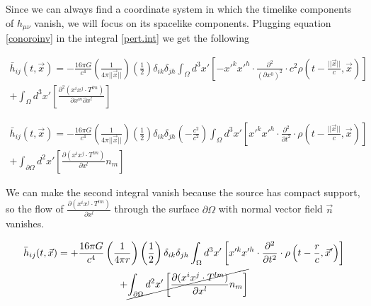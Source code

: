 Since we can always find a coordinate system in which the timelike components of $h_{\mu\nu}$ vanish, we will focus on its spacelike components. Plugging equation \ref{conoroinv} in the integral \ref{pert.int} we get the following


\begin{equation}
\begin{gathered}
\bar{h}_{ij}(t, \vec{x}) = -\frac{16\pi G}{c^4} \left(\frac{1}{4\pi||\vec{x}||}\right) \left(\frac{1}{2} \right) \delta_{ik} \delta_{jh} \int_{\Omega} d^3x' \left[ -x'^k x'^h \cdot \frac{\partial^2}{(\partial {x^0})^2} \cdot c^2  \rho\left(t-\frac{||\vec{x}||}{c}, \vec{x}\right)\right] \\ 
+ \int_{\Omega} d^3x' \left[\frac{\partial^2(x^i x^j \cdot T^{lm})}{\partial x^m \partial x^l} \right]
\end{gathered} 
\end{equation}

\begin{equation}
\begin{gathered}
\bar{h}_{ij}(t, \vec{x}) = -\frac{16\pi G}{c^4} \left(\frac{1}{4\pi||\vec{x}||}\right) \left(\frac{1}{2} \right) \delta_{ik} \delta_{jh} \left(-\frac{c^2}{c^2}\right) \int_{\Omega} d^3x' \left[ x'^k x'^h \cdot \frac{\partial^2}{\partial t^2} \cdot  \rho\left(t-\frac{||\vec{x}||}{c}, \vec{x}\right) \right] \\+  \int_{\partial\Omega} d^2x' \left[ \frac{\partial(x^i x^j \cdot T^{lm})}{\partial x^l} n_m \right] 
\end{gathered}
\end{equation}


We can make the second integral vanish because the source has compact support, so the flow of $\frac{\partial(x^i x^j \cdot T^{lm})}{\partial x^l}$ through the surface $\partial \Omega$ with normal vector field $\vec{n}$ vanishes.

\begin{equation}
\begin{gathered}
\bar{h}_{ij}(t, \vec{x}) = +\frac{16\pi G}{c^4} \left(\frac{1}{4\pi r}\right) \left(\frac{1}{2} \right) \delta_{ik} \delta_{jh} \int_{\Omega} d^3x' \left[ x'^k x'^h \cdot \frac{\partial^2}{\partial t^2} \cdot \rho\left(t-\frac{r}{c}, \vec{x}'\right) \right] \\+ \cancel{ \int_{\partial\Omega} d^2x' \left[ \frac{\partial(x^i x^j \cdot T^{lm})}{\partial x^l} n_m \right] }
\end{gathered}
\end{equation}



